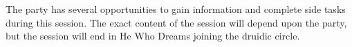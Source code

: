 The party has several opportunities to gain information and complete side tasks during this session.
The exact content of the session will depend upon the party, but the session will end in He Who Dreams joining the druidic circle.
